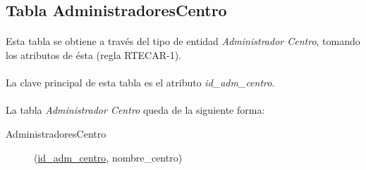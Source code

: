    \subsection{Tabla AdministradoresCentro}

      \paragraph{}Esta tabla se obtiene a través del tipo de entidad
      \textit{Administrador Centro}, tomando los atributos de ésta (regla
      RTECAR-1).

      \paragraph{}La clave principal de esta tabla es el atributo
      \textit{id\_adm\_centro}.

      \paragraph{}La tabla \textit{Administrador Centro} queda de la siguiente
      forma:

      \begin{description}
         \item[AdministradoresCentro] \begin{flushleft}(\underline{id\_adm\_centro},
         nombre\_centro)\end{flushleft}
      \end{description}
